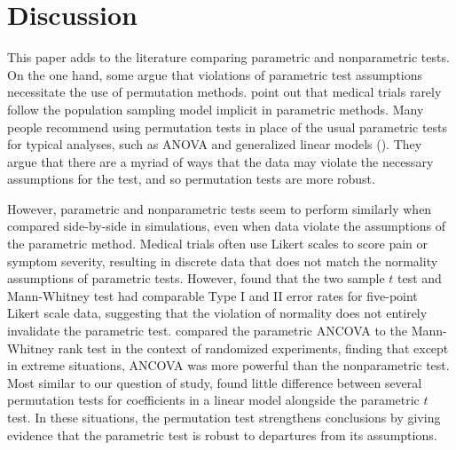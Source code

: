 \documentclass[12pt]{article}
\begin{document}
\section{Discussion}\label{sec:discussion}



This paper adds to the literature comparing parametric and nonparametric tests.
On the one hand, some argue that violations of parametric test assumptions necessitate the use of permutation methods.
\cite{ludbrook_why_1998} point out that medical trials rarely follow the population sampling model implicit in parametric methods.
Many people recommend using permutation tests in place of the usual parametric tests for typical analyses, such as ANOVA and generalized linear models (\cite{still_approximate_1981, winkler_permutation_2014}).
They argue that there are a myriad of ways that the data may violate the necessary assumptions for the test, and so permutation tests are more robust.

However, parametric and nonparametric tests seem to perform similarly when compared side-by-side in simulations, even when data violate the assumptions of the parametric method.
Medical trials often use Likert scales to score pain or symptom severity, resulting in discrete data that does not match the normality assumptions of parametric tests.
However, \cite{winter_five-point_2010} found that the two sample $t$ test and Mann-Whitney test had comparable Type I and II error rates for five-point Likert scale data, suggesting that the violation of normality does not entirely invalidate the parametric test.
\cite{vickers_parametric_2005} compared the parametric ANCOVA to the Mann-Whitney rank test in the context of randomized experiments, finding that except in extreme situations, ANCOVA was more powerful than the nonparametric test.
Most similar to our question of study, \cite{anderson_empirical_1999} found little difference between several permutation tests for coefficients in a linear model alongside the parametric $t$ test.
In these situations, the permutation test strengthens conclusions by giving evidence that the parametric test is robust to departures from its assumptions.
\end{document}

